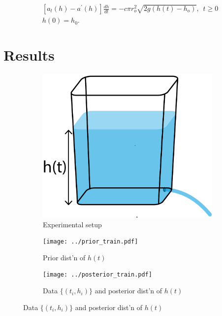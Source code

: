 \documentclass[openacc]{rsproca_new}%
\begin{document}
\begin{align}
& [a_t(h)-a^\prime(h)]\frac{dh}{dt}= -c \pi r_o^2 \sqrt{2g (h(t)-h_o)}, \,\,\, t \geq 0 \\
& h(0)=h_0.
\end{align}


\section{Results}

\begin{figure}[h!]
    \centering
        \begin{subfigure}[b]{0.3\textwidth}
    	\includegraphics[width=\textwidth]{../tank_geometry/naked_tank.pdf}
	\caption{Experimental setup} \label{fig:naked_tank}
    \end{subfigure}
    
     \begin{subfigure}[b]{0.49\textwidth}
    	\texttt{[image: ../prior\_train.pdf]}
	\caption{Prior dist'n of $h(t)$} \label{fig:prior_train}
    \end{subfigure}
     \begin{subfigure}[b]{0.49\textwidth}
    	\texttt{[image: ../posterior\_train.pdf]}
	\caption{Data $\{(t_i, h_i)\}$ and posterior dist'n of $h(t)$} \label{fig:posterior_train}
    \end{subfigure}
    

\end{figure}
\end{document}
